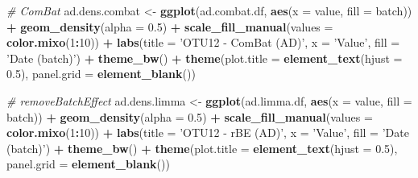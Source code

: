 \documentclass[]{book}
\newenvironment{Shaded}{\begin{snugshade}}{\end{snugshade}}
\newcommand{\KeywordTok}[1]{\textcolor[rgb]{0.13,0.29,0.53}{\textbf{#1}}}
\newcommand{\DataTypeTok}[1]{\textcolor[rgb]{0.13,0.29,0.53}{#1}}
\newcommand{\DecValTok}[1]{\textcolor[rgb]{0.00,0.00,0.81}{#1}}
\newcommand{\FloatTok}[1]{\textcolor[rgb]{0.00,0.00,0.81}{#1}}
\newcommand{\StringTok}[1]{\textcolor[rgb]{0.31,0.60,0.02}{#1}}
\newcommand{\CommentTok}[1]{\textcolor[rgb]{0.56,0.35,0.01}{\textit{#1}}}
\newcommand{\OperatorTok}[1]{\textcolor[rgb]{0.81,0.36,0.00}{\textbf{#1}}}
\newcommand{\NormalTok}[1]{#1}
\begin{document}
\begin{Shaded}
\begin{Highlighting}[]
\CommentTok{# ComBat}
\NormalTok{ad.dens.combat <-}\StringTok{ }\KeywordTok{ggplot}\NormalTok{(ad.combat.df, }\KeywordTok{aes}\NormalTok{(}\DataTypeTok{x =}\NormalTok{ value, }\DataTypeTok{fill =}\NormalTok{ batch)) }\OperatorTok{+}\StringTok{ }
\StringTok{  }\KeywordTok{geom_density}\NormalTok{(}\DataTypeTok{alpha =} \FloatTok{0.5}\NormalTok{) }\OperatorTok{+}\StringTok{ }\KeywordTok{scale_fill_manual}\NormalTok{(}\DataTypeTok{values =} \KeywordTok{color.mixo}\NormalTok{(}\DecValTok{1}\OperatorTok{:}\DecValTok{10}\NormalTok{)) }\OperatorTok{+}\StringTok{ }
\StringTok{  }\KeywordTok{labs}\NormalTok{(}\DataTypeTok{title =} \StringTok{'OTU12 - ComBat (AD)'}\NormalTok{, }\DataTypeTok{x =} \StringTok{'Value'}\NormalTok{, }\DataTypeTok{fill =} \StringTok{'Date (batch)'}\NormalTok{) }\OperatorTok{+}\StringTok{ }
\StringTok{  }\KeywordTok{theme_bw}\NormalTok{() }\OperatorTok{+}\StringTok{ }\KeywordTok{theme}\NormalTok{(}\DataTypeTok{plot.title =} \KeywordTok{element_text}\NormalTok{(}\DataTypeTok{hjust =} \FloatTok{0.5}\NormalTok{), }
                     \DataTypeTok{panel.grid =} \KeywordTok{element_blank}\NormalTok{())}


\CommentTok{# removeBatchEffect}
\NormalTok{ad.dens.limma <-}\StringTok{ }\KeywordTok{ggplot}\NormalTok{(ad.limma.df, }\KeywordTok{aes}\NormalTok{(}\DataTypeTok{x =}\NormalTok{ value, }\DataTypeTok{fill =}\NormalTok{ batch)) }\OperatorTok{+}\StringTok{ }
\StringTok{  }\KeywordTok{geom_density}\NormalTok{(}\DataTypeTok{alpha =} \FloatTok{0.5}\NormalTok{) }\OperatorTok{+}\StringTok{ }\KeywordTok{scale_fill_manual}\NormalTok{(}\DataTypeTok{values =} \KeywordTok{color.mixo}\NormalTok{(}\DecValTok{1}\OperatorTok{:}\DecValTok{10}\NormalTok{)) }\OperatorTok{+}\StringTok{ }
\StringTok{  }\KeywordTok{labs}\NormalTok{(}\DataTypeTok{title =} \StringTok{'OTU12 - rBE (AD)'}\NormalTok{, }\DataTypeTok{x =} \StringTok{'Value'}\NormalTok{, }\DataTypeTok{fill =} \StringTok{'Date (batch)'}\NormalTok{) }\OperatorTok{+}\StringTok{ }
\StringTok{  }\KeywordTok{theme_bw}\NormalTok{() }\OperatorTok{+}\StringTok{ }\KeywordTok{theme}\NormalTok{(}\DataTypeTok{plot.title =} \KeywordTok{element_text}\NormalTok{(}\DataTypeTok{hjust =} \FloatTok{0.5}\NormalTok{), }
                     \DataTypeTok{panel.grid =} \KeywordTok{element_blank}\NormalTok{())}



\end{Highlighting}
\end{Shaded}
\end{document}
